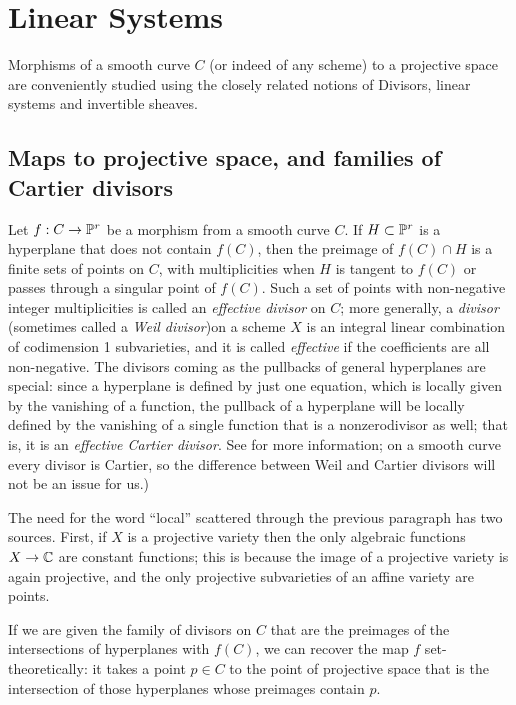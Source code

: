 

\chapter{Linear Systems}

Morphisms of a smooth curve $C$ (or indeed of any scheme) to a projective space are conveniently studied using the closely related notions of Divisors, linear systems and invertible sheaves. 

\section{Maps to projective space, and families of Cartier divisors}

Let $f: C\to {\mathbb P}^{r}$ be a morphism from a smooth curve $C$. If $H\subset {\mathbb P}^r$ is a hyperplane that does not contain $f(C)$, then the preimage of $f(C)\cap H$ is a finite sets of points on $C$, with multiplicities when $H$ is tangent to $f(C)$ or passes through a singular point of $f(C)$. Such a set of points with non-negative integer multiplicities is called an \emph{effective divisor} on $C$; more generally, a \emph{divisor} (sometimes called a \emph{Weil divisor})on a scheme $X$ is an integral linear combination of codimension 1 subvarieties, and it is called \emph{effective} if the coefficients are all non-negative. The divisors coming as the pullbacks of general hyperplanes are special: since a hyperplane is defined by just one equation, which is locally given by the vanishing of a function, the pullback of a hyperplane will be locally defined by the vanishing of a single function that is a nonzerodivisor as well; that is, it is an  \emph{effective Cartier divisor}. See \cite[pp. 140-146]{H} for more information; on a smooth curve every divisor is Cartier, so the difference between Weil and Cartier divisors will not be an issue for us.) 

The need for the word ``local'' scattered through the previous paragraph has two sources. First, if $X$ is a projective variety then the only algebraic functions $X\to {\mathbb C}$ are constant functions; this is because the image of a projective variety
is again projective, and the only projective subvarieties of an affine variety are points. 

If we are given the family of divisors on $C$ that are the preimages of the intersections of hyperplanes with  $f(C)$, we can recover the map $f$ set-theoretically: it takes a point $p\in C$ to the point of projective space that is the intersection of those
hyperplanes whose preimages contain $p$. 

